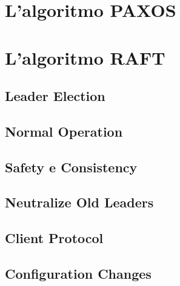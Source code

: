 	\section{L'algoritmo PAXOS}
	\section{L'algoritmo RAFT}
		\subsection{Leader Election}
		\subsection{Normal Operation}
		\subsection{Safety e Consistency}
		\subsection{Neutralize Old Leaders}
		\subsection{Client Protocol}
		\subsection{Configuration Changes}